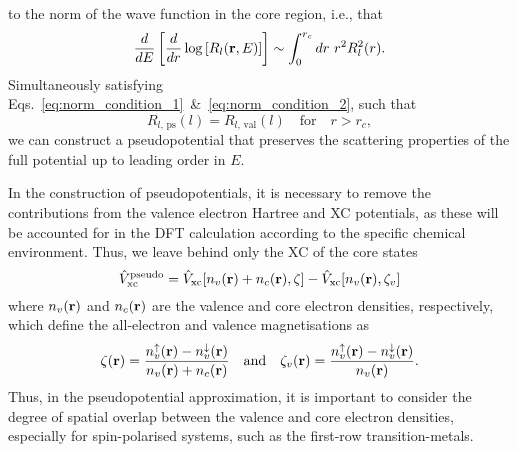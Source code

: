 to the norm of the wave function in the core region, i.e., {that} 
%
\begin{equation}
\frac{d}{dE}\left[\frac{d}{dr}\log\left[R_l({\bf r}, E) \right]\right] \sim 
\int_0^{r_c}dr\ r^2 R_l^2(r).
\label{eq:norm_condition_2}
\end{equation}
%
Simultaneously satisfying 
Eqs.~\eqref{eq:norm_condition_1}~\&~\eqref{eq:norm_condition_2},  
such that 
%
\begin{equation}
R_{l,\,\textrm{ps}}(l)=R_{l,\,\textrm{val}}(l) 
\quad\mbox{for}\quad
r>r_c,
\end{equation}
%
we can construct a pseudopotential 
that preserves the scattering 
properties of the full potential 
up to leading order in $E$.

{
In the construction of pseudopotentials, 
it is necessary to remove the contributions from the 
valence electron Hartree and XC potentials, 
{as these will be accounted for in the DFT calculation 
according to the specific chemical environment.}
%
Thus, we leave behind only the XC of the core states  
%
\begin{equation}
\hat{V}_\textrm{xc}^\textrm{pseudo}=\hat{V}_\textrm{xc}[n_v({\bf r})+n_c({\bf r}),\zeta] -\hat{V}_\textrm{xc}[n_v({\bf r}),\zeta_v] 
\label{eq:xc_pseudo}
\end{equation}
%
where $n_v({\bf r})$ and $n_c({\bf r})$ 
are the valence and core electron densities, respectively, 
which define the all-electron and valence magnetisations as 
%
\begin{equation}
\zeta({\bf r})=\frac{n^\uparrow_v({\bf r})-n^\downarrow_v({\bf r})}{n_v({\bf r})+n_c({\bf r})}
\quad\mbox{and}\quad
\zeta_v({\bf r})=\frac{n^\uparrow_v({\bf r})-n^\downarrow_v({\bf r})}{n_v({\bf r})}.
\end{equation}
%
Thus, 
in the pseudopotential approximation, 
it is important to consider 
the degree of spatial overlap 
between the valence and core electron densities, 
especially for spin-polarised systems,
{such as} the first-row transition-metals.

}
